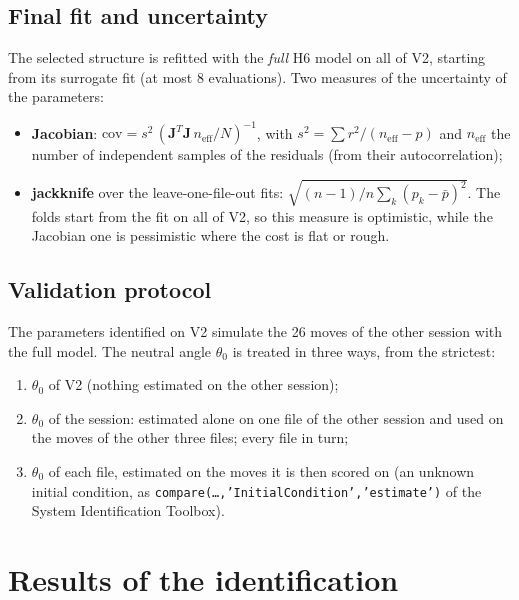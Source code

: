 \documentclass[10pt,a4paper]{article}
\numberwithin{equation}{section}
\begin{document}
\subsection{Final fit and uncertainty}
The selected structure is refitted with the \emph{full} H6 model on all of V2, starting from its surrogate fit (at most 8 evaluations). Two measures of the uncertainty of the parameters:
\begin{itemize}
\item \textbf{Jacobian}: $\mathrm{cov}=s^2\,(\mathbf J^T\mathbf J\,n_\mathrm{eff}/N)^{-1}$, with $s^2=\sum r^2/(n_\mathrm{eff}-p)$ and $n_\mathrm{eff}$ the number of independent samples of the residuals (from their autocorrelation);
\item \textbf{jackknife} over the leave-one-file-out fits: $\sqrt{(n-1)/n\sum_k(p_k-\bar p)^2}$. The folds start from the fit on all of V2, so this measure is optimistic, while the Jacobian one is pessimistic where the cost is flat or rough.
\end{itemize}

\subsection{Validation protocol}
The parameters identified on V2 simulate the 26 moves of the other session with the full model. The neutral angle $\theta_0$ is treated in three ways, from the strictest:
\begin{enumerate}
\item $\theta_0$ of V2 (nothing estimated on the other session);
\item $\theta_0$ of the session: estimated alone on one file of the other session and used on the moves of the other three files; every file in turn;
\item $\theta_0$ of each file, estimated on the moves it is then scored on (an unknown initial condition, as \texttt{compare(\dots,'InitialCondition','estimate')} of the System Identification Toolbox).
\end{enumerate}

\section{Results of the identification}\label{sec:results}
\end{document}
